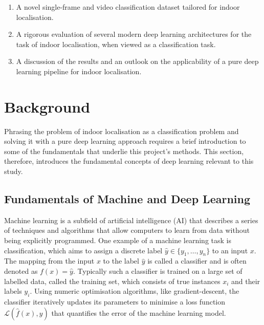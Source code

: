 \documentclass[a4paper]{article}
\begin{document}
\begin{enumerate} 

  \item A novel single-frame and video classification dataset tailored for
    indoor localisation.

  \item A rigorous evaluation of several modern deep learning architectures for
    the task of indoor localisation, when viewed as a classification task.

  \item A discussion of the results and an outlook on the applicability of a
    pure deep learning pipeline for indoor localisation.

\end{enumerate}


\section{Background} %
\label{sec:background}

Phrasing the problem of indoor localisation as a classification problem and
solving it with a pure deep learning approach requires a brief introduction to
some of the fundamentals that underlie this project's methods. This section,
therefore, introduces the fundamental concepts of deep learning relevant to this
study.

\subsection{Fundamentals of Machine and Deep Learning}

Machine learning is a subfield of artificial intelligence (AI) that describes a
series of techniques and algorithms that allow computers to learn from data
without being explicitly programmed. One example of a machine learning task is
classification, which aims to assign a discrete label $\hat{y} \in \{y_1,
\ldots, y_n\}$ to an input $x$. The mapping from the input $x$ to the label
$\hat{y}$ is called a classifier and is often denoted as $f(x) = \hat{y}$.
Typically such a classifier is trained on a large set of labelled data, called
the training set, which consists of true instances $x_i$ and their labels $y_i$.
Using numeric optimisation algorithms, like gradient-descent, the classifier
iteratively updates its parameters to minimise a loss function
$\mathcal{L}(\hat{f}(x), y)$ that quantifies the error of the machine learning
model.
\end{document}
